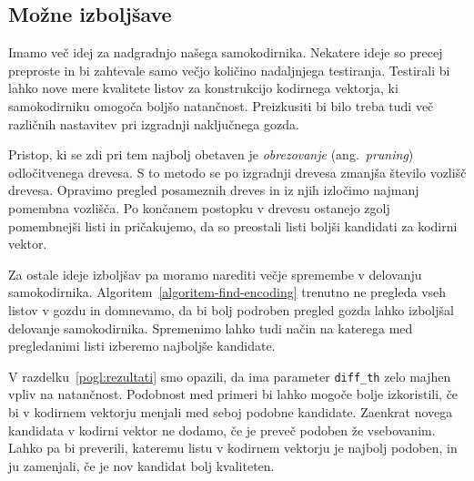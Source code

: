 \documentclass[12pt,a4paper,twoside]{article}
\theoremstyle{definition} %
\theoremstyle{plain} %
\numberwithin{equation}{section}  %
\begin{document}


\subsection{Možne izboljšave}


Imamo več idej za nadgradnjo našega samokodirnika.
Nekatere ideje so precej preproste in bi zahtevale samo večjo količino nadaljnjega testiranja.
Testirali bi lahko nove mere kvalitete listov za konstrukcijo kodirnega vektorja, ki samokodirniku omogoča boljšo natančnost.
Preizkusiti bi bilo treba tudi več različnih nastavitev pri izgradnji naključnega gozda.

Pristop, ki se zdi pri tem najbolj obetaven je \emph{obrezovanje} (ang.~\textsl{pruning}) odločitvenega drevesa. %
S to metodo se po izgradnji drevesa zmanjša število vozlišč drevesa.
Opravimo pregled posameznih dreves in iz njih izločimo najmanj pomembna vozlišča.
Po končanem postopku v drevesu ostanejo zgolj pomembnejši listi in pričakujemo, da so preostali listi boljši kandidati za kodirni vektor.

Za ostale ideje izboljšav pa moramo narediti večje spremembe v delovanju samokodirnika.
Algoritem~\ref{algoritem-find-encoding} trenutno ne pregleda vseh listov v gozdu in domnevamo, da bi bolj podroben pregled gozda lahko izboljšal delovanje samokodirnika.
Spremenimo lahko tudi način na katerega med pregledanimi listi izberemo najboljše kandidate.

V razdelku~\ref{pogl:rezultati} smo opazili, da ima parameter \texttt{diff\_th} zelo majhen vpliv na natančnost.
Podobnost med primeri bi lahko mogoče bolje izkoristili, če bi v kodirnem vektorju menjali med seboj podobne kandidate.
Zaenkrat novega kandidata v kodirni vektor ne dodamo, če je preveč podoben že vsebovanim.
Lahko pa bi preverili, kateremu listu v kodirnem vektorju je najbolj podoben, in ju zamenjali, če je nov kandidat bolj kvaliteten.
\end{document}
